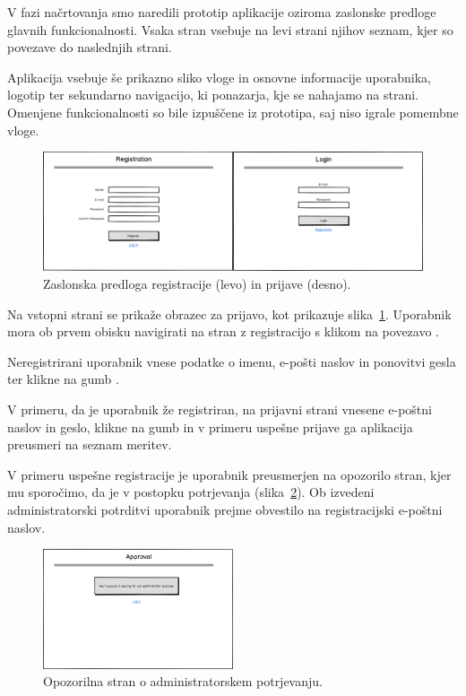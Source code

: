 \documentclass[a4paper, 12pt]{book}
\begin{document}
V fazi načrtovanja smo naredili prototip aplikacije oziroma zaslonske predloge glavnih funkcionalnosti. Vsaka stran vsebuje na levi strani njihov seznam, kjer so povezave do naslednjih strani. 

Aplikacija vsebuje še prikazno sliko vloge in osnovne informacije uporabnika, logotip ter sekundarno navigacijo, ki ponazarja, kje se nahajamo na strani. Omenjene funkcionalnosti so bile izpuščene iz prototipa, saj niso igrale pomembne vloge.

\begin{figure}[h]
\begin{center}
\includegraphics[width=\textwidth]{slike/registration_and_Login-wireframe.png}
\end{center}
\caption{Zaslonska predloga registracije (levo) in prijave (desno).}
\label{registration-login-wireframe}
\end{figure}

Na vstopni strani se prikaže obrazec za prijavo, kot prikazuje slika~\ref{registration-login-wireframe}. Uporabnik mora ob prvem obisku navigirati na stran z registracijo s klikom na povezavo .

Neregistrirani uporabnik vnese podatke o imenu, e-pošti naslov in ponovitvi gesla ter klikne na gumb .

V primeru, da je uporabnik že registriran, na prijavni strani vnesene e-poštni naslov in geslo, klikne na gumb  in v primeru uspešne prijave ga aplikacija preusmeri na seznam meritev.


V primeru uspešne registracije je uporabnik preusmerjen na opozorilo stran, kjer mu sporočimo, da je v postopku potrjevanja (slika~\ref{approval-wireframe}).
Ob izvedeni administratorski potrditvi uporabnik prejme obvestilo na registracijski e-poštni naslov.

\begin{figure}[h]
\begin{center}
\includegraphics[width=0.5\textwidth]{slike/NotAlloved.png}
\end{center}
\caption{Opozorilna stran o administratorskem potrjevanju.}
\label{approval-wireframe}
\end{figure}
\end{document}
